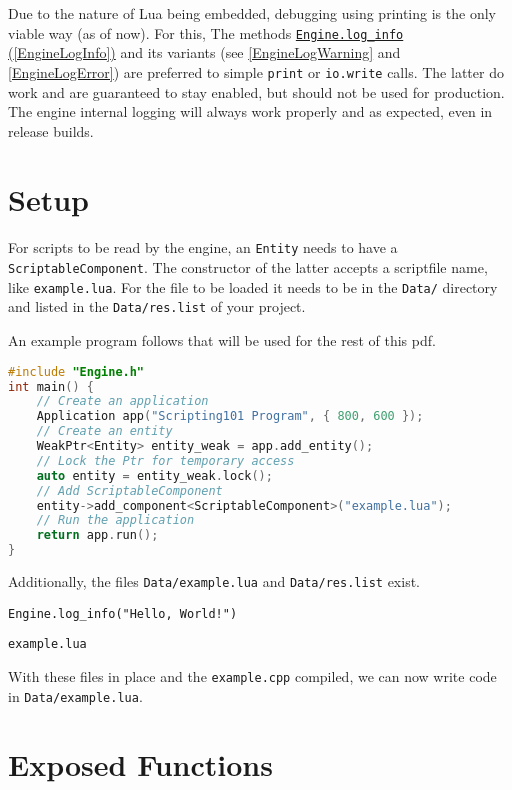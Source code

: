 \documentclass[12pt,a4paper]{article}
\begin{document}
Due to the nature of Lua being embedded, debugging using printing is the only viable way (as of now). For this, The methods \hyperref[EngineLogInfo]{\texttt{Engine.log\_info} (\ref{EngineLogInfo})} and its variants (see \ref{EngineLogWarning} and \ref{EngineLogError}) are preferred to simple \texttt{print} or \texttt{io.write} calls. The latter do work and are guaranteed to stay enabled, but should not be used for production. The engine internal logging will always work properly and as expected, even in release builds.

\pagebreak
\section{Setup}

For scripts to be read by the engine, an \texttt{Entity} needs to have a  \texttt{ScriptableComponent}. The constructor of the latter accepts a scriptfile name, like \texttt{example.lua}. For the file to be loaded it needs to be in the \texttt{Data/} directory and listed in the \texttt{Data/res.list} of your project.

An example program follows that will be used for the rest of this pdf.

\begin{lstlisting}[language=C++,title=example.cpp]
#include "Engine.h"
int main() {
	// Create an application
	Application app("Scripting101 Program", { 800, 600 });
	// Create an entity
	WeakPtr<Entity> entity_weak = app.add_entity();
	// Lock the Ptr for temporary access
	auto entity = entity_weak.lock();
	// Add ScriptableComponent
	entity->add_component<ScriptableComponent>("example.lua");
	// Run the application
	return app.run();
}
\end{lstlisting}

Additionally, the files \texttt{Data/example.lua} and \texttt{Data/res.list} exist.

\begin{lstlisting}[language={[5.0]Lua},title=Data/example.lua]
Engine.log_info("Hello, World!")
\end{lstlisting}

\begin{lstlisting}[title=Data/res.list]
example.lua
\end{lstlisting}

With these files in place and the \texttt{example.cpp} compiled, we can now write code in \texttt{Data/example.lua}.

\pagebreak
\section{Exposed Functions}
\end{document}

